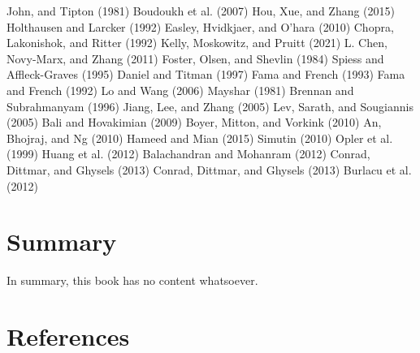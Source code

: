 \documentclass[
  letterpaper,
  DIV=11,
  numbers=noendperiod]{scrreprt}
\begin{document}
John, and Tipton (1981) Boudoukh et al. (2007) Hou, Xue, and Zhang
(2015) Holthausen and Larcker (1992) Easley, Hvidkjaer, and O'hara
(2010) Chopra, Lakonishok, and Ritter (1992) Kelly, Moskowitz, and
Pruitt (2021) L. Chen, Novy-Marx, and Zhang (2011) Foster, Olsen, and
Shevlin (1984) Spiess and Affleck-Graves (1995) Daniel and Titman (1997)
Fama and French (1993) Fama and French (1992) Lo and Wang (2006) Mayshar
(1981) Brennan and Subrahmanyam (1996) Jiang, Lee, and Zhang (2005) Lev,
Sarath, and Sougiannis (2005) Bali and Hovakimian (2009) Boyer, Mitton,
and Vorkink (2010) An, Bhojraj, and Ng (2010) Hameed and Mian (2015)
Simutin (2010) Opler et al. (1999) Huang et al. (2012) Balachandran and
Mohanram (2012) Conrad, Dittmar, and Ghysels (2013) Conrad, Dittmar, and
Ghysels (2013) Burlacu et al. (2012)


\hypertarget{summary}{%
\chapter{Summary}\label{summary}}

In summary, this book has no content whatsoever.


\hypertarget{references}{%
\chapter*{References}\label{references}}

\end{document}
